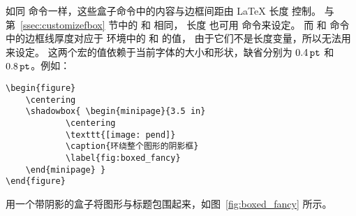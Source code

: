 如同  命令一样，这些盒子命令中的内容与边框间距由 \LaTeX{} 长度  控制。
与第~\ref{ssec:customizefbox} 节中的  和  相同，
长度  也可用  命令来设定。
而  和  命令中的边框线厚度对应于  环境中的  和  的值，
由于它们不是长度变量，所以无法用  来设定。
这两个宏的值依赖于当前字体的大小和形状，缺省分别为 $0.4\,\mathtt{pt}$ 和 $0.8\,\mathtt{pt}$。例如：
\begin{lstlisting}
\begin{figure}
	\centering
	\shadowbox{ \begin{minipage}{3.5 in}
			\centering
			\texttt{[image: pend]}
			\caption{环绕整个图形的阴影框}
			\label{fig:boxed_fancy}
	\end{minipage} }
\end{figure}
\end{lstlisting}
用一个带阴影的盒子将图形与标题包围起来，如图~\ref{fig:boxed_fancy} 所示。

\begin{figure}
	\centering
\end{figure}


\endinput